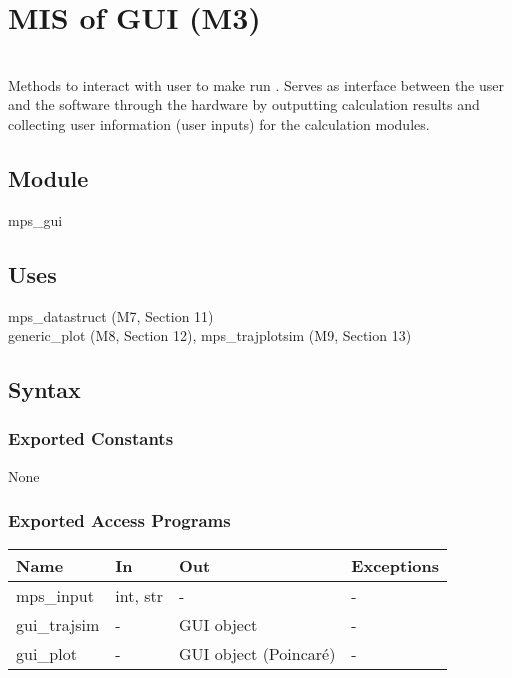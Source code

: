 \documentclass[12pt, titlepage]{article}
\begin{document}
\section{MIS of \progname{}GUI (M3)} \label{Module} 


\\

Methods to interact with user to make run \progname{}. Serves as 
interface between the user and the software through 
the hardware by outputting calculation results and collecting user information 
(user inputs) for the calculation modules.

\subsection{Module}

mps\_gui

\subsection{Uses}

mps\_datastruct (M7, Section 11)\\
generic\_plot (M8, Section 12), mps\_trajplotsim (M9, Section 13) 

\subsection{Syntax}

\subsubsection{Exported Constants}

None

\subsubsection{Exported Access Programs}

\begin{center}
\begin{tabular}{p{2cm} p{4cm} p{4cm} p{2cm}}
\hline
\textbf{Name} & \textbf{In} & \textbf{Out} & \textbf{Exceptions} \\
\hline
mps\_input & int, str & - & - \\
gui\_trajsim & - & GUI object & - \\
gui\_plot & - & GUI object (Poincar\'{e}) & - \\
\hline
\end{tabular}
\end{center}
\end{document}

